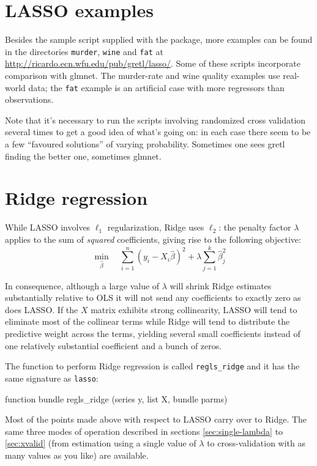 \documentclass{article}
\begin{document}
\section{LASSO examples}
\label{sec:examples}

Besides the sample script supplied with the package, more examples can
be found in the directories \texttt{murder}, \texttt{wine} and
\texttt{fat} at \url{http://ricardo.ecn.wfu.edu/pub/gretl/lasso/}.
Some of these scripts incorporate comparison with \textsf{glmnet}.
The murder-rate and wine quality examples use real-world data; the
\texttt{fat} example is an artificial case with more regressors than
observations.

Note that it's necessary to run the scripts involving randomized cross
validation several times to get a good idea of what's going on: in
each case there seem to be a few ``favoured solutions'' of varying
probability. Sometimes one sees gretl finding the better one,
sometimes \textsf{glmnet}.

\section{Ridge regression}
\label{sec:ridge}

While LASSO involves $\ell_1$ regularization, Ridge uses $\ell_2$: the
penalty factor $\lambda$ applies to the sum of \textit{squared}
coefficients, giving rise to the following objective:
\begin{equation}
  \label{eq:ridge-obj}
  \min_{\hat{\beta}} \quad
  \sum_{i=1}^n (y_i - X_i\hat{\beta})^2 + \lambda \sum_{j=1}^k \hat{\beta}_j^2
\end{equation}

In consequence, although a large value of $\lambda$ will shrink Ridge
estimates substantially relative to OLS it will not send any
coefficients to exactly zero as does LASSO. If the $X$ matrix exhibits
strong collinearity, LASSO will tend to eliminate most of the
collinear terms while Ridge will tend to distribute the predictive
weight across the terms, yielding several small coefficients instead
of one relatively substantial coefficient and a bunch of zeros.

The function to perform Ridge regression is called
\texttt{regls\_ridge} and it has the same signature as \texttt{lasso}:
\begin{code}
function bundle regls_ridge (series y, list X, bundle parms)
\end{code}

Most of the points made above with respect to LASSO carry over to
Ridge. The same three modes of operation described in sections
\ref{sec:single-lambda} to \ref{sec:xvalid} (from estimation using a
single value of $\lambda$ to cross-validation with as many values as
you like) are available.
\end{document}
